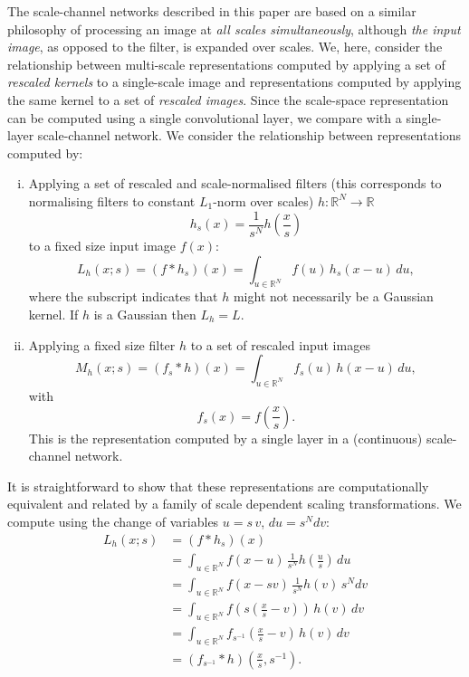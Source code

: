 \documentclass[twocolumn,runningheads]{svjour3}
\def\bbbr{{\mathbb R}}
\begin{document}
The scale-channel networks described in this paper are
based on a similar philosophy of processing an image at 
{\em all scales simultaneously\/}, although {\em the input image\/},
as opposed to the filter, is expanded over scales. We, here, consider
the relationship between multi-scale representations computed by
applying a set of {\em rescaled kernels\/} to a single-scale image and
representations computed by applying the same kernel to a set of
{\em rescaled images\/}. Since the scale-space representation can be computed using a single
convolutional layer, we compare with a single-layer
scale-channel network.
We consider the relationship between representations computed by:  
\begin{enumerate}[(i)]	
	\item 
	Applying a set of rescaled and scale-normalised filters (this
	corresponds to normalising filters to constant $L_1$-norm over
	scales) $h: \mathbb{R}^N \to \mathbb{R}$ 
	\begin{equation}\label{eq-scaled_and_normalised_filters}
	h_s(x) = \frac{1}{s^{N}} h(\frac{x}{s})
	\end{equation}
	to a fixed size input image $f(x)$: 
	\begin{equation}\label{eq-Lh}
	L_h(x;s) = (f*h_s)(x) = \int_{u \in \bbbr^N} f(u)\,h_s(x - u)\,du,
	\end{equation}
	where the subscript indicates that $h$ might not necessarily be
	a Gaussian kernel. If $h$ is a Gaussian then $L_h = L$. 
	\item 
	Applying a fixed size filter $h$ to a set of rescaled input images 
	\begin{equation}
	\label{eq-Mh}
	M_h(x;s) = (f_s*h)(x) = \int_{u \in \bbbr^N} f_s(u)\,h(x - u)\,du,
	\end{equation}
	with
	\begin{equation}
	f_s(x) = f(\frac{x}{s}).
	\end{equation}
	This is the representation computed by a single layer in a
	(continuous) scale-channel network. 
\end{enumerate}
It is straightforward to show that these representations are
computationally equivalent and related by a family of scale dependent
scaling transformations.
We compute using the change of variables $u =s\,v$, $du = s^{N} dv$:\begin{align}\label{eq-filter-to-image}
L_h(x;s) &=  (f*h_s)(x) \nonumber \\
&= \int_{u \in \bbbr^N} f(x-u)\, \frac{1}{s^{N}}h(\frac{u}{s})\,du \nonumber \\
&= \int_{u \in \bbbr^N} f(x - s v )\, \frac{1}{s^{N}}h(v)\, s^{N}dv \nonumber \\
&= \int_{u \in \bbbr^N} f(s(\frac{x}{s}-v))\, h(v)\,dv \nonumber \\
&= \int_{u \in \bbbr^N} f_{s^{-1}}(\frac{x}{s}-v)\,h(v)\,dv \nonumber \\
&= (f_{s^{-1}} * h)(\frac{x}{s},s^{-1}).
\end{align}
\end{document}
